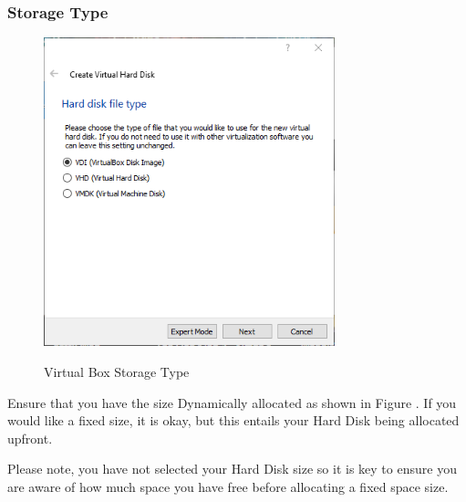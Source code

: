 \subsubsection{Storage Type}
\begin{figure}[!htb]
    \centering
    \includegraphics[width=0.752\textwidth]{images/Win00-04.png}\\[0cm]  
    \caption[Windows Virtual Box]{Virtual Box Storage Type}
    \label{fig:00-05 - Windows Virtual Box Storage Type} 
\end{figure}
Ensure that you have the size Dynamically allocated as shown in Figure .
If you would like a fixed size, it is okay, but this entails your Hard Disk
being allocated upfront.

Please note, you have not selected your Hard Disk size so it is key to ensure
you are aware of how much space you have free before allocating a fixed space size.

